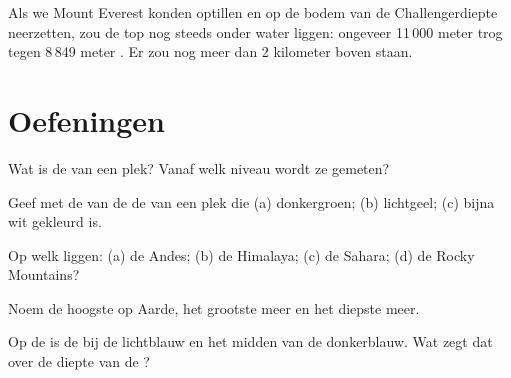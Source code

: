 \begin{example}\label{ex:g4:world-physical-map:everest-in-deep}
Als we Mount Everest konden optillen en op de bodem van de Challengerdiepte
neerzetten, zou de top nog steeds onder water liggen: ongeveer 11\,000
meter trog tegen 8\,849 meter . Er zou nog meer dan 2 kilometer 
boven staan.
\end{example}

\section{Oefeningen}

\begin{exercise}[$\star$]\label{exo:g4:world-physical-map:1}
Wat is de  van een plek? Vanaf welk niveau wordt ze gemeten?
\end{exercise}

\begin{exercise}[$\star$]\label{exo:g4:world-physical-map:2}
Geef met de  van de  de  van een plek die
(a) donkergroen; (b) lichtgeel; (c) bijna wit gekleurd is.
\end{exercise}

\begin{exercise}[$\star$]\label{exo:g4:world-physical-map:3}
Op welk  liggen: (a) de Andes; (b) de Himalaya; (c) de Sahara;
(d) de Rocky Mountains?
\end{exercise}

\begin{exercise}[$\star$]\label{exo:g4:world-physical-map:4}
Noem de hoogste  op Aarde, het grootste meer en het diepste meer.
\end{exercise}

\begin{exercise}[$\star$]\label{exo:g4:world-physical-map:5}
Op de  is de  bij de  lichtblauw en het midden
van de  donkerblauw. Wat zegt dat over de diepte van de ?
\end{exercise}

